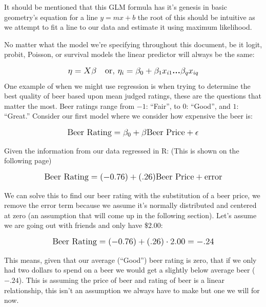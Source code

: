 \documentclass[12pt]{article}\usepackage[]{graphicx}\usepackage[]{color}
\begin{document}
\begin{flushleft}
It should be mentioned that this GLM formula has it's genesis in basic geometry's equation for a line $y=mx + b$ the root of this should be intuitive as we attempt to fit a line to our data and estimate it using maximum likelihood.

No matter what the model we're specifying throughout this document, be it logit, probit, Poisson, or survival models the linear predictor will always be the same:

\begin{equation}
\mathlarger{ \eta = X\beta \text{ \text{  }  or,  }}
\mathlarger{ \eta_i = \beta_0 + \beta_1 x_{i1} \textbf{...} \beta_q x_{iq}  }
\end{equation}
One example of when we might use regression is when trying to determine the best quality of beer based upon mean judged ratings, these are the questions that matter the most. Beer ratings range from $-1$: ``Fair'', to $0$: ``Good'', and $1$: ``Great.'' Consider our first model where we consider how expensive the beer is:

\begin{equation}
\mathlarger{ \text{Beer Rating} = \beta_0 + \beta \text{Beer Price} + \epsilon }
\end{equation}

\noindent Given the information from our data regressed in R: (This is shown on the following page)

\begin{equation}
\mathlarger{ \text{Beer Rating} =  (-0.76) + (.26) \text{Beer Price} + \text{error} }
\end{equation}

We can solve this to find our beer rating with the substitution of a beer price, we remove the error term because we assume it's normally distributed and centered at zero (an assumption that will come up in the following section). Let's assume we are going out with friends and only have \$2.00:

\begin{equation}
\mathlarger{  \text{Beer Rating} = (-0.76)+(.26)\cdot 2.00 = -.24 }
\end{equation}

This means, given that our average (``Good'') beer rating is zero, that if we only had two dollars to spend on a beer we would get a slightly below average beer ($-.24$). This is assuming the price of beer and rating of beer is a linear relationship, this isn't an assumption we always have to make but one we will for now.


\end{flushleft}
\end{document}
